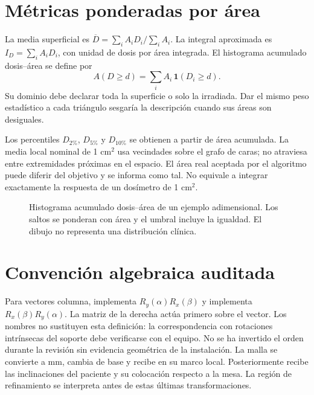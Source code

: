 \section{Métricas ponderadas por área}
La media superficial es $\overline D=\sum_i A_iD_i/\sum_i A_i$. La integral aproximada es $I_D=\sum_i A_iD_i$, con unidad de dosis por área integrada. El histograma acumulado dosis--área se define por
\begin{equation}
A(D\geq d)=\sum_i A_i\,\mathbf1(D_i\geq d).
\end{equation}
Su dominio debe declarar toda la superficie o solo la irradiada. Dar el mismo peso estadístico a cada triángulo sesgaría la descripción cuando sus áreas son desiguales.

Los percentiles $D_{2\%}$, $D_{5\%}$ y $D_{10\%}$ se obtienen a partir de área acumulada. La media local nominal de 1 cm$^2$ usa vecindades sobre el grafo de caras; no atraviesa entre extremidades próximas en el espacio. El área real aceptada por el algoritmo puede diferir del objetivo y se informa como tal. No equivale a integrar exactamente la respuesta de un dosímetro de 1 cm$^2$.

\begin{figure}[htbp]\centering
\caption{Histograma acumulado dosis--área de un ejemplo adimensional. Los saltos se ponderan con área y el umbral incluye la igualdad. El dibujo no representa una distribución clínica.}\label{fig:metricas}\end{figure}
\FloatBarrier

\section{Convención algebraica auditada}
Para vectores columna,  implementa $R_y(\alpha)R_x(\beta)$ y  implementa $R_x(\beta)R_y(\alpha)$. La matriz de la derecha actúa primero sobre el vector. Los nombres no sustituyen esta definición: la correspondencia con rotaciones intrínsecas del soporte debe verificarse con el equipo. No se ha invertido el orden durante la revisión sin evidencia geométrica de la instalación.
La malla se convierte a mm, cambia de base y recibe  en su marco local. Posteriormente recibe las inclinaciones del paciente y su colocación respecto a la mesa. La región de refinamiento se interpreta antes de estas últimas transformaciones.
